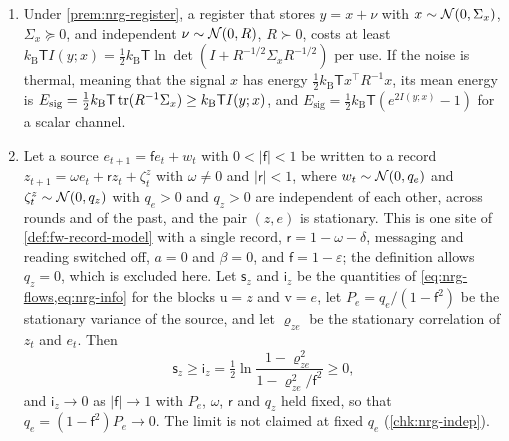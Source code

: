 \begin{proposition}\label{prop:nrg-channel}
\begin{enumerate}
\item[(a)] Under \cref{prem:nrg-register}, a register that stores $y=x+\nu$ with $x\sim\mathcal{N}(0,\Sigma_x)$, $\Sigma_x\succeq0$, and independent $\nu\sim\mathcal{N}(0,R)$, $R\succ0$, costs at least $k_{\mathrm B}\mathsf TI(y;x)=\tfrac12k_{\mathrm B}\mathsf T\ln\det(I+R^{-1/2}\Sigma_xR^{-1/2})$ per use. If the noise is thermal, meaning that the signal $x$ has energy $\tfrac12k_{\mathrm B}\mathsf Tx^\top R^{-1}x$, its mean energy is $E_{\mathrm{sig}}=\tfrac12k_{\mathrm B}\mathsf T\operatorname{tr}(R^{-1}\Sigma_x)\ge k_{\mathrm B}\mathsf TI(y;x)$, and $E_{\mathrm{sig}}=\tfrac12k_{\mathrm B}\mathsf T(e^{2I(y;x)}-1)$ for a scalar channel.
\item[(b)] Let a source $e_{t+1}=\mathsf fe_t+w_t$ with $0<\vert\mathsf f\vert<1$ be written to a record $z_{t+1}=\omega e_t+\mathsf rz_t+\zeta^z_t$ with $\omega\ne0$ and $\vert\mathsf r\vert<1$, where $w_t\sim\mathcal{N}(0,q_e)$ and $\zeta^z_t\sim\mathcal{N}(0,q_z)$ with $q_e>0$ and $q_z>0$ are independent of each other, across rounds and of the past, and the pair $(z,e)$ is stationary. This is one site of \cref{def:fw-record-model} with a single record, $\mathsf r=1-\omega-\delta$, messaging and reading switched off, $a=0$ and $\beta=0$, and $\mathsf f=1-\varepsilon$; the definition allows $q_z=0$, which is excluded here. Let $\mathsf s_z$ and $\mathsf i_z$ be the quantities of \cref{eq:nrg-flows,eq:nrg-info} for the blocks $\mathrm u=z$ and $\mathrm v=e$, let $P_e=q_e/(1-\mathsf f^2)$ be the stationary variance of the source, and let $\varrho_{ze}$ be the stationary correlation of $z_t$ and $e_t$. Then
\begin{equation}\label{eq:nrg-record}
\mathsf s_z\ge\mathsf i_z=\tfrac12\ln\frac{1-\varrho_{ze}^2}{1-\varrho_{ze}^2/\mathsf f^2}\ge0,
\end{equation}
and $\mathsf i_z\to0$ as $\vert\mathsf f\vert\to1$ with $P_e$, $\omega$, $\mathsf r$ and $q_z$ held fixed, so that $q_e=(1-\mathsf f^2)P_e\to0$. The limit is not claimed at fixed $q_e$ (\cref{chk:nrg-indep}).
\end{enumerate}
\end{proposition}

